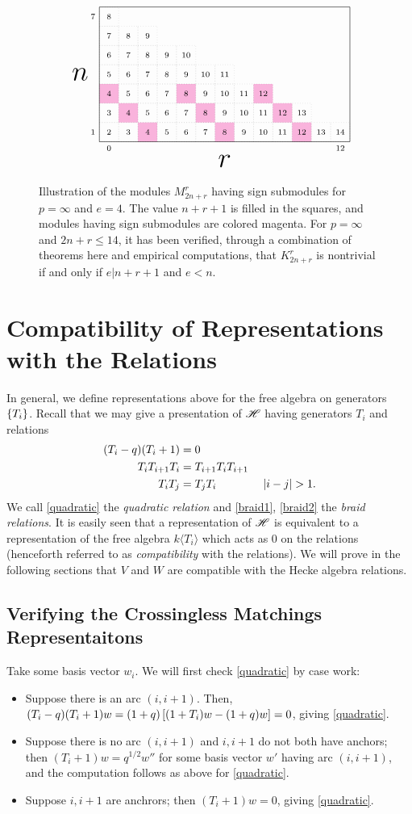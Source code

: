\documentclass{amsart}
\begin{document}
\begin{figure}
  \[
    \ENRGrid{13/7}{3/1,7/1,11/1,2/2,6/2,10/2,1/3,5/3,9/3}
  \]
  \caption{
    Illustration of the modules $M_{2n + r}^r$ having sign submodules for $p = \infty$ and $e = 4$.
    The value $n + r + 1$ is filled in the squares, and modules having sign submodules are colored magenta.
    For $p = \infty$ and $2n + r \leq 14$, it has been verified, through a combination of theorems here and empirical computations, that $K_{2n + r}^r$ is nontrivial if and only if $e | n+r+1$ and $e < n$.
  }\label{Empirical Kernel}
\end{figure}


\newpage
\appendix
\section{Compatibility of Representations with the Relations}
In general, we define representations above for the free algebra on generators $\left\{ T_i \right\}$.
Recall that we may give a presentation of $\mathscr{H}$ having generators $T_i$ and relations
\begin{align}
  (T_i - q)(T_i + 1) &= 0 \label{quadratic}\\
  T_iT_{i+1}T_i &= T_{i+1}T_iT_{i+1} \label{braid1}\\ 
  T_iT_j &= T_jT_i \hspace{40pt} \left| i - j \right| > 1. \label{braid2}
\end{align}
We call \eqref{quadratic} the \emph{quadratic relation} and \eqref{braid1}, \eqref{braid2} the \emph{braid relations}.
It is easily seen that a representation of $\mathscr{H}$ is equivalent to a representation of the free algebra $k\langle T_i \rangle$ which acts as 0 on the relations (henceforth referred to as \emph{compatibility} with the relations).
We will prove in the following sections that $V$ and $W$ are compatible with the Hecke algebra relations.

\subsection{Verifying the Crossingless Matchings Representaitons}
\label{Cross Relations}
Take some basis vector $w_i$.
We will first check \eqref{quadratic} by case work:
\begin{itemize}
  \item Suppose there is an arc $(i,i+1)$.
    Then, $(T_i-q)(T_i + 1)w = (1 + q)\left[ (1 + T_i)w - (1 + q)w \right] = 0$, giving \eqref{quadratic}.

 
  \item Suppose there is no arc $(i,i+1)$ and $i,i+1$ do not both have anchors;
    then $(T_i +  1)w = q^{1/2}w''$ for some basis vector $w'$ having arc $(i,i+1)$, and the computation follows as above for \eqref{quadratic}.
  \item Suppose $i,i+1$ are anchrors;
    then $(T_i + 1)w = 0$, giving \eqref{quadratic}.
\end{itemize}
   
\end{document}
